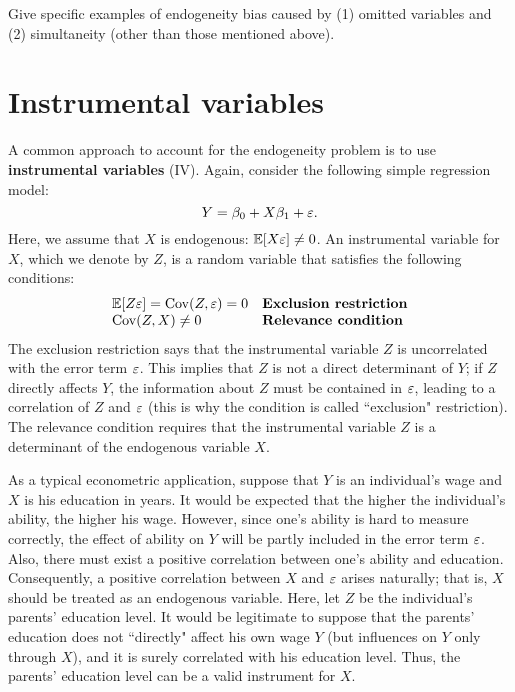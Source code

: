 \documentclass[11pt, A4paper, openany, uplatex]{book}
\begin{document}
\begin{framed}
\begin{exercise}\upshape
	Give specific examples of endogeneity bias caused by (1) omitted variables and (2) simultaneity (other than those mentioned above).
\end{exercise}
\end{framed}

\section{Instrumental variables}

A common approach to account for the endogeneity problem is to use \textbf{instrumental variables} (IV).
Again, consider the following simple regression model: 
\[
	Y = \beta_0 + X \beta_1 + \varepsilon.
\]
Here, we assume that $X$ is endogenous: $\mathbb{E}[X\varepsilon] \neq 0$.
An instrumental variable for $X$, which we denote by $Z$, is a random variable that satisfies the following conditions:
\[
\begin{array}{ll}
	\E[Z \eps] = \Cov(Z, \eps) = 0 & \textbf{Exclusion restriction\index{exclusion restriction}} \\
	\Cov(Z, X) \neq 0 & \textbf{Relevance condition\index{relevance condition}}
\end{array}
\]
The exclusion restriction says that the instrumental variable $Z$ is uncorrelated with the error term $\varepsilon$.
This implies that $Z$ is not a direct determinant of $Y$; if $Z$ directly affects $Y$, the information about $Z$ must be contained in $\varepsilon$, leading to a correlation of $Z$ and $\varepsilon$ (this is why the condition is called ``exclusion" restriction).
The relevance condition requires that the instrumental variable $Z$ is a determinant of the endogenous variable $X$.

\begin{example}\upshape
	As a typical econometric application, suppose that $Y$ is an individual's wage and $X$ is his education in years.
	It would be expected that the higher the individual's ability, the higher his wage.
	However, since one's ability is hard to measure correctly, the effect of ability on $Y$ will be partly included in the error term $\varepsilon$.
	Also, there must exist a positive correlation between one's ability and education.
	Consequently, a positive correlation between $X$ and $\varepsilon$ arises naturally; that is, $X$ should be treated as an endogenous variable.
	Here, let $Z$ be the individual's parents' education level.
	It would be legitimate to suppose that the parents' education does not ``directly" affect his own wage $Y$ (but influences on $Y$ only through $X$), and it is surely correlated with his education level.
	Thus, the parents' education level can be a valid instrument for $X$.
\end{example}
\end{document}
